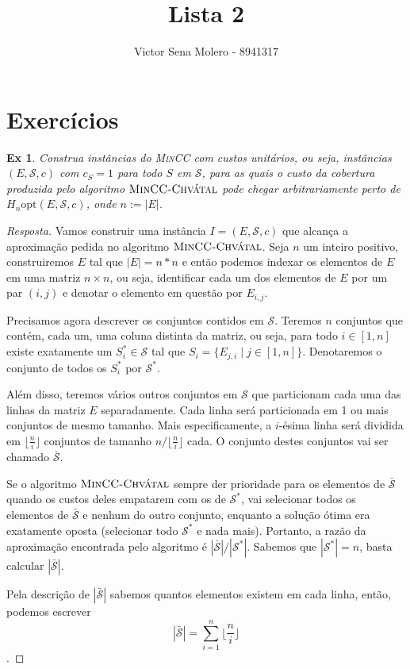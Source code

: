 \documentclass[12pt]{article}
\newcounter{exCounter}
\newtheorem{ex}[exCounter]{Ex}
\begin{document}
 
 
\title{Lista 2}
\author{Victor Sena Molero - 8941317}
\maketitle

\section{Exercícios}
\begin{ex}
Construa instâncias do \textsc{MinCC} com custos unitários, ou seja, instâncias $(E,\mathcal{S},c)$ com $c_S = 1$ para todo $S$ em $\mathcal{S}$, para as quais o custo da cobertura produzida pelo algoritmo $\textsc{MinCC-Chvátal}$ pode chegar arbitrariamente perto de $H_n\mathrm{opt}(E,\mathcal{S},c)$, onde $n := |E|$.
\end{ex}

\begin{proof}[Resposta]
Vamos construir uma instância $I = (E,\mathcal{S},c)$ que alcança a aproximação pedida no algoritmo $\textsc{MinCC-Chvátal}$. Seja $n$ um inteiro positivo, construiremos $E$ tal que $|E| = n*n$ e então podemos indexar os elementos de $E$ em uma matriz $n \times n$, ou seja, identificar cada um dos elementos de $E$ por um par $(i,j)$ e denotar o elemento em questão por $E_{i,j}$.  

Precisamos agora descrever os conjuntos contidos em $\mathcal{S}$. Teremos $n$ conjuntos que contém, cada um, uma coluna distinta da matriz, ou seja, para todo $i \in [1, n]$ existe exatamente um $S^*_i \in \mathcal{S}$ tal que $S_i = \{E_{j,i} \mid j \in [1, n]\}$. Denotaremos o conjunto de todos os $S^*_i$ por $\mathcal{S}^*$.

Além disso, teremos vários outros conjuntos em $\mathcal{S}$ que particionam cada uma das linhas da matriz $E$ separadamente. Cada linha será particionada em 1 ou mais conjuntos de mesmo tamanho. Mais especificamente, a $i$-ésima linha será dividida em $\lfloor \frac{n}{i} \rfloor$ conjuntos de tamanho $n/\lfloor \frac{n}{i} \rfloor$ cada. O conjunto destes conjuntos vai ser chamado $\bar{\mathcal{S}}$.

Se o algoritmo $\textsc{MinCC-Chvátal}$ sempre der prioridade para os elementos de $\bar{\mathcal{S}}$ quando os custos deles empatarem com os de $\mathcal{S}^*$, vai selecionar todos os elementos de $\bar{\mathcal{S}}$ e nenhum do outro conjunto, enquanto a solução ótima era exatamente oposta (selecionar todo $\mathcal{S}^*$ e nada mais). Portanto, a razão da aproximação encontrada pelo algoritmo é $|\bar{\mathcal{S}}|/|\mathcal{S}^*|$. Sabemos que $|\mathcal{S}^*| = n$, basta calcular $|\bar{\mathcal{S}}|$.

Pela descrição de $|\bar{\mathcal{S}}|$ sabemos quantos elementos existem em cada linha, então, podemos escrever
$$ |\bar{\mathcal{S}}| = \sum \limits_{i=1}^{n} \lfloor \frac{n}{i} \rfloor $$.
\end{proof}
\end{document}
